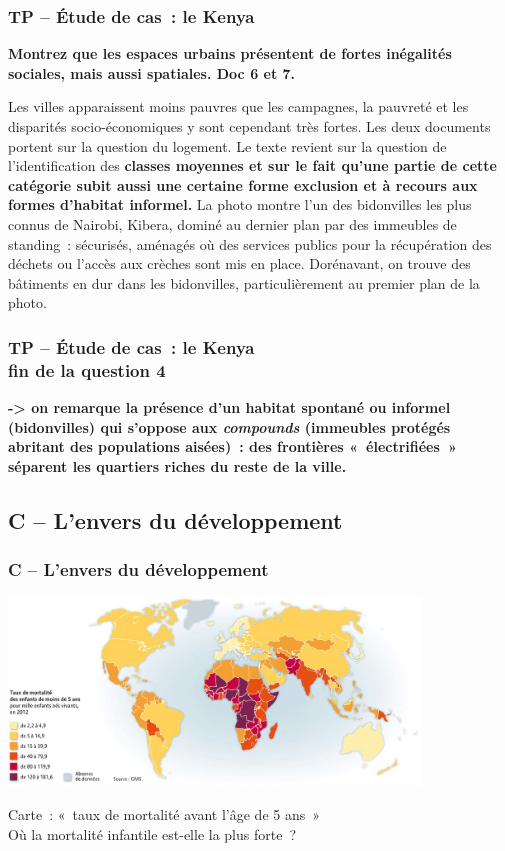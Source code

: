 \documentclass[C]{beamer}
\begin{document}
	\begin{frame}
	\frametitle{TP -- \'Etude de cas~: le Kenya}
	\begin{center}
	\textbf{Montrez que les espaces urbains présentent de fortes inégalités sociales, mais aussi spatiales. Doc 6 et 7.}\\
\pause
	\end{center}
Les villes apparaissent moins pauvres que les campagnes, la pauvreté et les disparités socio-économiques y sont cependant très fortes. Les deux documents portent sur la question du logement. Le texte revient sur la question de l'identification des \textbf{classes moyennes et sur le fait qu'une partie de cette catégorie subit aussi une certaine forme exclusion et à recours aux formes d'habitat informel.} La photo montre l'un des bidonvilles les plus connus de Nairobi, Kibera, dominé au dernier plan par des immeubles de standing~: sécurisés, aménagés où des services publics pour la récupération des déchets ou l'accès aux crèches sont mis en place. Dorénavant, on trouve des b\^atiments en dur dans les bidonvilles, particulièrement au premier plan de la photo.
	\end{frame}
	
	\begin{frame}
	\frametitle{TP -- \'Etude de cas~: le Kenya\\ fin de la question 4}
\textbf{-> on remarque la présence d'un habitat spontané ou informel (bidonvilles) qui s'oppose aux \textit{compounds} (immeubles protégés abritant des populations aisées)~: des frontières «~électrifiées~» séparent les quartiers riches du reste de la ville.}
	\end{frame}
	
	\subsection*{C -- L'envers du développement}
	\begin{frame}
	\frametitle{C -- L'envers du développement}
	\begin{center}
	\includegraphics[height=5cm]{images/carte_1_04.jpg}
	\end{center}
Carte~: «~taux de mortalité avant l'âge de 5 ans~»
\\
Où la mortalité infantile est-elle la plus forte~?	
	\end{frame}
	
\end{document}
